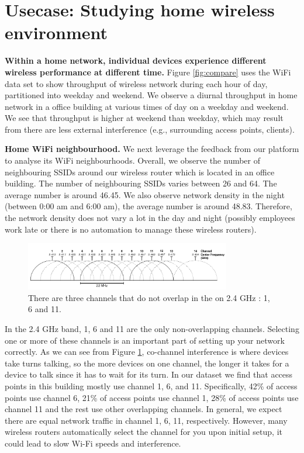 \section{Usecase: Studying home wireless environment}
\label{sec.usecase3}

\textbf{Within a home network, individual devices experience different wireless performance at different time.} Figure \ref{fig:compare} uses the WiFi data set to show throughput of wireless network during each hour of day, partitioned into weekday and weekend. We observe a diurnal throughput in home network in a office building at various times of day on a weekday and weekend. We see that throughput is higher at weekend than weekday, which may result from there are less external interference (e.g., surrounding access points, clients).

\textbf{Home WiFi neighbourhood.} We next leverage the feedback from our platform to analyse its WiFi neighbourhoods. Overall, we observe the number of neighbouring SSIDs around our wireless router which is located in an office building. The number of neighbouring SSIDs varies between 26 and 64. The average number is around 46.45. We also observe network density in the night (between 0:00 am and 6:00 am), the average number is around 48.83. Therefore, the network density does not vary a lot in the day and night (possibly employees work late or there is no automation to manage these wireless routers).

\begin{figure}
\centering
\includegraphics[width=0.8\textwidth]{figure/2GHz_WiFi_channels.png}
\caption{There are three channels that do not overlap in the on 2.4 GHz : 1, 6 and 11.} 
\label{fig:channels}
\end{figure}

In the 2.4 GHz band, 1, 6 and 11 are the only non-overlapping channels. Selecting one or more of these channels is an important part of setting up your network correctly. As we can see from Figure \ref{fig:channels}, co-channel interference is where devices take turns talking, so the more devices on one channel, the longer it takes for a device to talk since it has to wait for its turn. In our dataset we find that access points in this building mostly use channel 1, 6, and 11. Specifically, 42\% of access points use channel 6, 21\% of access points use channel 1, 28\% of access points use channel 11 and the rest use other overlapping channels. In general, we expect there are equal network traffic in channel 1, 6, 11, respectively. However,  many wireless routers automatically select the channel for you upon initial setup, it could lead to slow Wi-Fi speeds and interference. 

